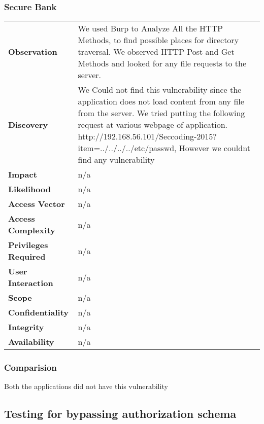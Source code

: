 \subsubsection{Secure Bank}
\begin{tabular}{l|p{10cm}}
\textbf{Observation} & We used Burp to Analyze All the HTTP Methods, to find possible places for directory traversal. We observed HTTP Post and Get Methods and looked for any file requests to the server.  \\
\textbf{Discovery} & We Could not find this vulnerability since the application does not load content from any file from the server. We tried putting the following request at various webpage of application. http://192.168.56.101/Seccoding-2015?item=../../../../etc/passwd, However we couldnt find any vulnerability \\
\textbf{Impact} &  n/a\\
\textbf{Likelihood} & n/a \\
\textbf{Access Vector} & n/a \\
\textbf{Access Complexity} & n/a \\
\textbf{Privileges Required} & n/a \\
\textbf{User Interaction} & n/a \\
\textbf{Scope} & n/a \\
\textbf{Confidentiality} & n/a \\
\textbf{Integrity} & n/a \\
\textbf{Availability} & n/a \\
\end{tabular}

\subsubsection{Comparision}
Both the applications did not have this vulnerability
\subsection{Testing for bypassing authorization schema}
